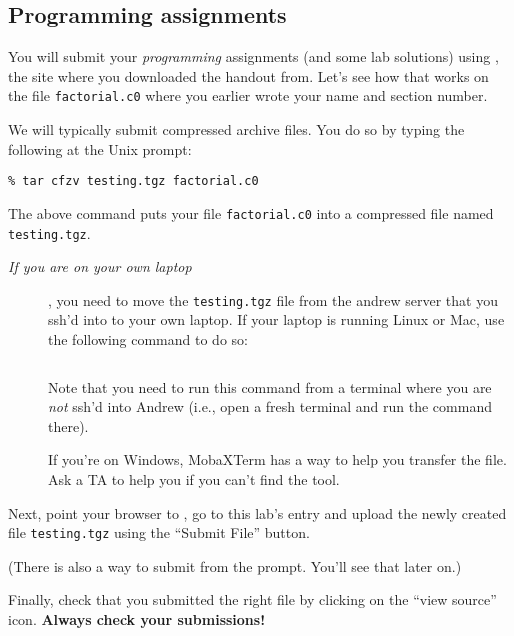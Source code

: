 \subsection*{Programming assignments}
\begin{part}
You will submit your \emph{programming} assignments (and some lab
solutions) using \autolab{}, the site where you downloaded the handout
from.  Let's see how that works on the file \lstinline'factorial.c0'
where you earlier wrote your name and section number.

We will typically submit compressed archive files.  You do so by
typing the following at the Unix prompt:

\lstinline[language={[coin]C}]'%

The above command puts your file \lstinline'factorial.c0' into a
compressed file named \lstinline'testing.tgz'.

\begin{description}
\item[{\em If you are on your own laptop}], you need to move the
    \lstinline'testing.tgz' file
    from the andrew server that you ssh'd into to your own laptop.
    If your laptop is running Linux or Mac, use the following command
    to do so:
        \begin{lstlisting}[language={[coin]C}]
% scp <your_id>@unix.andrew.cmu.edu:private/15122/lab01/handout/testing.tgz .
        \end{lstlisting}
Note that you need to run this command from a terminal where
    you are \emph{not} ssh'd into Andrew (i.e., open a fresh terminal
    and run the command there).

If you're on Windows, MobaXTerm has a way to help you transfer the file.
Ask a TA to help you if you can't find the tool.
\end{description}

Next, point your browser to \autolab, go to this lab's entry and
upload the newly created file \lstinline'testing.tgz' using the
``Submit File'' button.

(There is also a way to submit from the prompt.  You'll see that later
on.)

Finally, check that you submitted the right file by clicking on the
``view source'' icon.  \textbf{Always check your submissions!}
\end{part}




